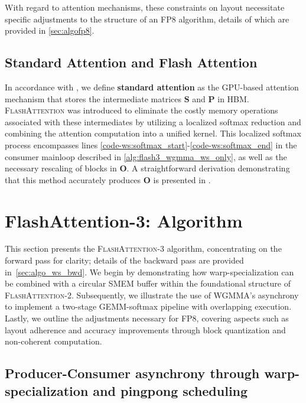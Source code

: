 With regard to attention mechanisms, these constraints on layout necessitate specific adjustments to the structure of an FP8 algorithm, details of which are provided in \cref{sec:algofp8}.

\subsection{Standard Attention and Flash Attention} In accordance with \citet{dao2022flashattention}, we define \textbf{standard attention} as the GPU-based attention mechanism that stores the intermediate matrices $\mathbf{S}$ and $\mathbf{P}$ in HBM. \textsc{FlashAttention} was introduced to eliminate the costly memory operations associated with these intermediates by utilizing a localized softmax reduction and combining the attention computation into a unified kernel. This localized softmax process encompasses lines \ref{code-ws:softmax_start}-\ref{code-ws:softmax_end} in the consumer mainloop described in \cref{alg:flash3_wgmma_ws_only}, as well as the necessary rescaling of blocks in $\mathbf{O}$. A straightforward derivation demonstrating that this method accurately produces $\mathbf{O}$ is presented in \cite[\S 2.3.1]{dao2023flashattention2}.

\section{FlashAttention-3: Algorithm}
\label{sec:algo}

This section presents the \textsc{FlashAttention-3} algorithm, concentrating on the forward pass for clarity; details of the backward pass are provided in~\cref{sec:algo_ws_bwd}. We begin by demonstrating how warp-specialization can be combined with a circular SMEM buffer within the foundational structure of \textsc{FlashAttention-2}. Subsequently, we illustrate the use of WGMMA's asynchrony to implement a two-stage GEMM-softmax pipeline with overlapping execution. Lastly, we outline the adjustments necessary for FP8, covering aspects such as layout adherence and accuracy improvements through block quantization and non-coherent computation.

\subsection{Producer-Consumer asynchrony through warp-specialization and pingpong scheduling}
\label{sec:algo_ws}

